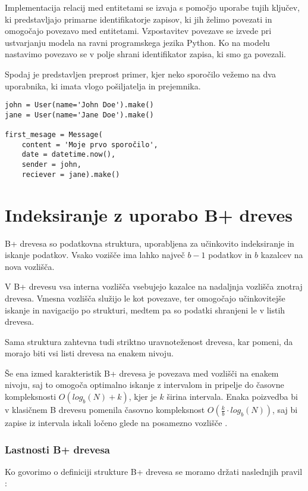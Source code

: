 \documentclass[a4paper,12pt,openright]{book}
\begin{document}
        Implementacija relacij med entitetami se izvaja s pomočjo uporabe tujih ključev, ki predstavljajo primarne identifikatorje zapisov, ki jih želimo povezati in omogočajo povezavo med entitetami. Vzpostavitev povezave se izvede pri ustvarjanju modela na ravni programskega jezika Python. Ko na modelu nastavimo povezavo se v polje shrani identifikator zapisa, ki smo ga povezali.

        Spodaj je predstavljen preprost primer, kjer neko sporočilo vežemo na dva uporabnika, ki imata vlogo pošiljatelja in prejemnika.
\begin{verbatim}
john = User(name='John Doe').make()
jane = User(name='Jane Doe').make()

first_mesage = Message(
    content = 'Moje prvo sporočilo',
    date = datetime.now(),
    sender = john,
    reciever = jane).make()
\end{verbatim}

    \section{Indeksiranje z uporabo B+ dreves}

        B+ drevesa so podatkovna struktura, uporabljena za učinkovito indeksiranje in iskanje podatkov. Vsako vozišče ima lahko največ $b - 1$ podatkov in $b$ kazalcev na nova vozlišča.

        V B+ drevesu vsa interna vozlišča vsebujejo kazalce na nadaljnja vozlišča znotraj drevesa. Vmesna vozlišča služijo le kot povezave, ter omogočajo učinkovitejše iskanje in navigacijo po strukturi, medtem pa so podatki shranjeni le v listih drevesa.

        Sama struktura zahtevna tudi striktno uravnoteženost drevesa, kar pomeni, da morajo biti vsi listi drevesa na enakem nivoju.

        Še ena izmed karakteristik B+ drevesa je povezava med vozlišči na enakem nivoju, saj to omogoča optimalno iskanje z intervalom in pripelje do časovne kompleksnosti $O(log_b(N) + k)$, kjer je $k$ širina intervala. Enaka poizvedba bi v klasičnem B drevesu pomenila časovno kompleksnost $O(\frac{k}{b} \cdot log_b(N))$, saj bi zapise iz intervala iskali ločeno glede na posamezno vozlišče \cite{BPTREE}.

        \subsubsection{Lastnosti B+ drevesa}
        Ko govorimo o definiciji strukture B+ drevesa se moramo držati naslednjih pravil \cite{goodrich2011data}:
\end{document}
